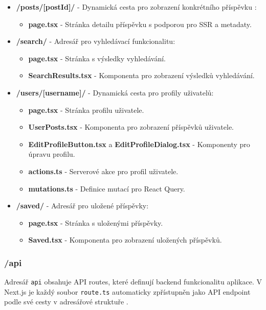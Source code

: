 \documentclass[12pt]{article}
\begin{document}
\begin{itemize}
  \item \textbf{/posts/[postId]/} - Dynamická cesta pro zobrazení konkrétního příspěvku \citep{Vercel2023DynamicRoutes}:
  \begin{itemize}
    \item \textbf{page.tsx} - Stránka detailu příspěvku s podporou pro SSR a metadaty.
  \end{itemize}
  
  \item \textbf{/search/} - Adresář pro vyhledávací funkcionalitu:
  \begin{itemize}
    \item \textbf{page.tsx} - Stránka s výsledky vyhledávání.
    \item \textbf{SearchResults.tsx} - Komponenta pro zobrazení výsledků vyhledávání.
  \end{itemize}
  
  \item \textbf{/users/[username]/} - Dynamická cesta pro profily uživatelů:
  \begin{itemize}
    \item \textbf{page.tsx} - Stránka profilu uživatele.
    \item \textbf{UserPosts.tsx} - Komponenta pro zobrazení příspěvků uživatele.
    \item \textbf{EditProfileButton.tsx} a \textbf{EditProfileDialog.tsx} - Komponenty pro úpravu profilu.
    \item \textbf{actions.ts} - Serverové akce pro profil uživatele.
    \item \textbf{mutations.ts} - Definice mutací pro React Query.
  \end{itemize}
  
  \item \textbf{/saved/} - Adresář pro uložené příspěvky:
  \begin{itemize}
    \item \textbf{page.tsx} - Stránka s uloženými příspěvky.
    \item \textbf{Saved.tsx} - Komponenta pro zobrazení uložených příspěvků.
  \end{itemize}
\end{itemize}

\subsubsection{/api}

Adresář \texttt{api} obsahuje API routes, které definují backend funkcionalitu aplikace. V Next.js je každý soubor \texttt{route.ts} automaticky zpřístupněn jako API endpoint podle své cesty v adresářové struktuře \citep{Vercel2023RouteHandlers}.
\end{document}

